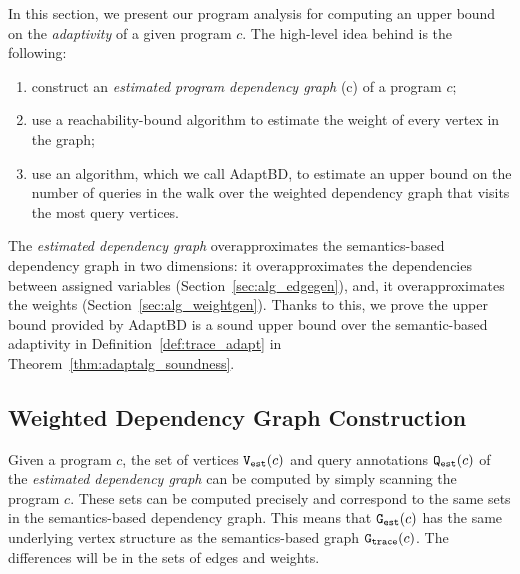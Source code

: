 In this section, we present our program analysis {\THESYSTEM} for
computing an upper bound on the \emph{adaptivity} of a given program
$c$.
%
 The high-level idea behind {\THESYSTEM} is the following:
  \begin{enumerate}
    \item construct
    an \emph{estimated program dependency graph} \progG(c) of a program $c$;
    \item use a reachability-bound algorithm to estimate the weight of every vertex in the graph;
    \item  use an algorithm, which we call AdaptBD, to estimate an upper bound on the number of queries in the walk over the weighted dependency graph that visits the most query vertices. %
  \end{enumerate}
  The \emph{estimated dependency graph} overapproximates the
  semantics-based dependency graph in two dimensions: it
  overapproximates the dependencies between assigned variables (Section~\ref{sec:alg_edgegen}), and, it
  overapproximates the weights (Section~\ref{sec:alg_weightgen}). Thanks to this, 
 we prove the upper bound provided by AdaptBD is a sound upper bound
  over the semantic-based adaptivity in Definition~\ref{def:trace_adapt} in Theorem~\ref{thm:adaptalg_soundness}.  

%
%
\subsection{Weighted Dependency Graph Construction}
Given a program $c$, the set of vertices $\mathtt{{V_{est}}}(c)$ and query annotations $\mathtt{{Q_{est}}}(c)$ of the \emph{estimated dependency graph} can be computed by simply
scanning the program $c$. These sets can be computed precisely and correspond to
the same sets in the semantics-based dependency graph.
This means that $\mathtt{{G_{est}}}(c)$ has the same underlying vertex structure as 
the semantics-based graph $\mathtt{{G_{trace}}}(c)$. The differences will be in the sets of edges and weights. 





